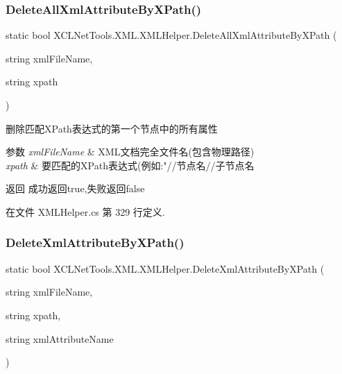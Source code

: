 \subsubsection{\texorpdfstring{Delete\+All\+Xml\+Attribute\+By\+X\+Path()}{DeleteAllXmlAttributeByXPath()}}
{\footnotesize\ttfamily static bool X\+C\+L\+Net\+Tools.\+X\+M\+L.\+X\+M\+L\+Helper.\+Delete\+All\+Xml\+Attribute\+By\+X\+Path (\begin{DoxyParamCaption}\item[{string}]{xml\+File\+Name,  }\item[{string}]{xpath }\end{DoxyParamCaption})\hspace{0.3cm}{\ttfamily [static]}}



删除匹配\+X\+Path表达式的第一个节点中的所有属性 


\begin{DoxyParams}{参数}
{\em xml\+File\+Name} & X\+M\+L文档完全文件名(包含物理路径)\\
\hline
{\em xpath} & 要匹配的\+X\+Path表达式(例如\+:"//节点名//子节点名\\
\hline
\end{DoxyParams}
\begin{DoxyReturn}{返回}
成功返回true,失败返回false
\end{DoxyReturn}


在文件 X\+M\+L\+Helper.\+cs 第 329 行定义.

\mbox{\label{class_x_c_l_net_tools_1_1_x_m_l_1_1_x_m_l_helper_a8907224fc217566b279babdbc2b14716}} 
\subsubsection{\texorpdfstring{Delete\+Xml\+Attribute\+By\+X\+Path()}{DeleteXmlAttributeByXPath()}}
{\footnotesize\ttfamily static bool X\+C\+L\+Net\+Tools.\+X\+M\+L.\+X\+M\+L\+Helper.\+Delete\+Xml\+Attribute\+By\+X\+Path (\begin{DoxyParamCaption}\item[{string}]{xml\+File\+Name,  }\item[{string}]{xpath,  }\item[{string}]{xml\+Attribute\+Name }\end{DoxyParamCaption})\hspace{0.3cm}{\ttfamily [static]}}



